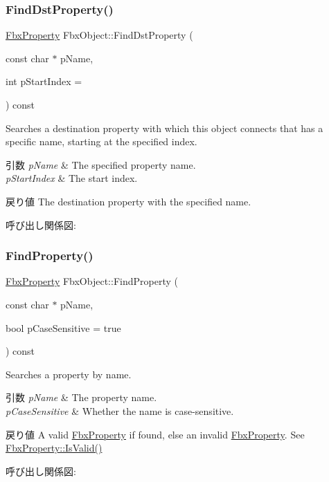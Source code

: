 \subsubsection{\texorpdfstring{Find\+Dst\+Property()}{FindDstProperty()}}
{\footnotesize\ttfamily \hyperlink{class_fbx_property}{Fbx\+Property} Fbx\+Object\+::\+Find\+Dst\+Property (\begin{DoxyParamCaption}\item[{const char $\ast$}]{p\+Name,  }\item[{int}]{p\+Start\+Index = {} }\end{DoxyParamCaption}) const}

Searches a destination property with which this object connects that has a specific name, starting at the specified index. 
\begin{DoxyParams}{引数}
{\em p\+Name} & The specified property name. \\
\hline
{\em p\+Start\+Index} & The start index. \\
\hline
\end{DoxyParams}
\begin{DoxyReturn}{戻り値}
The destination property with the specified name. 
\end{DoxyReturn}
呼び出し関係図\+:
\mbox{\label{class_fbx_object_a697319ff157f50b097f49118f5582f98}} 
\subsubsection{\texorpdfstring{Find\+Property()}{FindProperty()}\hspace{0.1cm}{\footnotesize\ttfamily [1/2]}}
{\footnotesize\ttfamily \hyperlink{class_fbx_property}{Fbx\+Property} Fbx\+Object\+::\+Find\+Property (\begin{DoxyParamCaption}\item[{const char $\ast$}]{p\+Name,  }\item[{bool}]{p\+Case\+Sensitive = {\ttfamily true} }\end{DoxyParamCaption}) const}

Searches a property by name. 
\begin{DoxyParams}{引数}
{\em p\+Name} & The property name. \\
\hline
{\em p\+Case\+Sensitive} & Whether the name is case-\/sensitive. \\
\hline
\end{DoxyParams}
\begin{DoxyReturn}{戻り値}
A valid \hyperlink{class_fbx_property}{Fbx\+Property} if found, else an invalid \hyperlink{class_fbx_property}{Fbx\+Property}. See \hyperlink{class_fbx_property_a1c40042c55d1f4a1d4837f06fbc1d764}{Fbx\+Property\+::\+Is\+Valid()} 
\end{DoxyReturn}
呼び出し関係図\+:
\mbox{\label{class_fbx_object_aab369c8ec541c9e6994a28015619e510}} 
